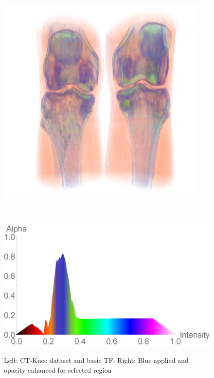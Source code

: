 \documentclass[twoside,twocolumn,10pt]{article}
\begin{document}
\begin{figure}
\begin{minipage}{.12\textwidth}
		\label{fig:tf_CT-Knee}
	\end{minipage}~
	\begin{minipage}{.1\textwidth}
		\centering
		\includegraphics[width=1\linewidth]{CT-Knee_blue_crop}
		\label{fig:CT-Knee_blue}
	\end{minipage}~
	\begin{minipage}{.12\textwidth}
		\centering
		\includegraphics[width=1\linewidth]{tf_CT-Knee_blue}
		\label{fig:tf_CT-Knee_blue}
	\end{minipage}
	\caption{Left: CT-Knee dataset and basic TF; Right: Blue applied and opacity enhanced for selected region}
	\label{fig:CT-knee_all}
	
\end{figure}
\end{document}
